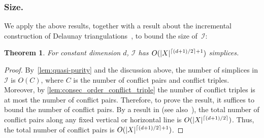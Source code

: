 \documentclass[11pt]{amsart}
\DeclarePairedDelimiter\ceil{\lceil}{\rceil}
\DeclarePairedDelimiter\abs{\lvert}{\rvert}
\newcommand{\Incr}[0]{\mathcal{I}}
\renewcommand{\subparagraph}[1]{\subsubsection*{\textbf{\textup{#1}}}}
\theoremstyle{plain}
\newtheorem{theorem}{Theorem}[section]
\theoremstyle{definition}
\theoremstyle{remark}
\newcommand{\SizeBound}{{\lceil (d+1)/2 \rceil + 1}}
\begin{document}
%
\subparagraph{Size.}
We apply the above results, together with a result about the incremental construction of Delaunay triangulations~\cite{edelsbrunnerIncrementalTopologicalFlipping1996}, to bound the size of~$\Incr$:
%
\begin{theorem}\label{thm:incr-size}
 For constant dimension $d$, $\Incr$ has $O(\abs{X}^{\SizeBound})$ simplices.
\end{theorem}
%
\begin{proof}
By~\cref{lem:quasi-purity} and the discussion above, the number of simplices in $\Incr$ is $O(C)$, where $C$
is the number of conflict pairs and conflict triples.  Moreover, by \cref{lem:consec_order_conflict_triple} the number of conflict triples is at most the number of conflict pairs.  Therefore, to prove the result, it suffices to bound the number of conflict pairs.  
By a result in \cite[Section 9]{edelsbrunnerIncrementalTopologicalFlipping1996} (see also~\cite[Theorem 2.6]{alonsoDelaunayBifiltrationsFunctions2024}), the total number of conflict pairs along any fixed vertical or horizontal line is $O(|X|^{\ceil{(d+1)/2}})$.  Thus, the total number of conflict pairs is $O(\abs{X}^{\ceil{(d+1)/2} + 1})$.
\end{proof}
%
%
%
%
\end{document}
